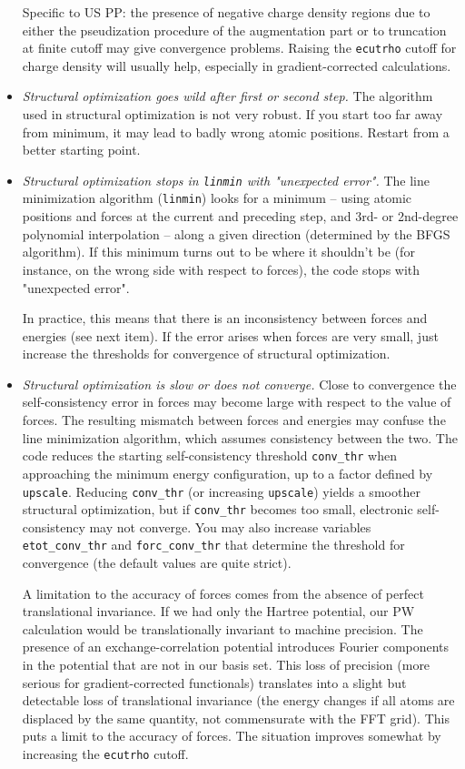 \documentclass[12pt]{article}
\begin{document}
\begin{itemize}
      Specific to US PP: the presence of negative charge density regions 
      due to either the pseudization procedure of the augmentation part 
      or to truncation at finite cutoff may give convergence problems.
      Raising the {\tt ecutrho} cutoff for charge density will usually
      help, especially in gradient-corrected calculations.
\item {\em Structural optimization goes wild after first or second step.}
      The algorithm used in structural optimization is not very robust.
      If you start too far away from minimum, it may lead to badly
      wrong atomic positions. Restart from a better starting point.
\item {\em Structural optimization stops in {\tt linmin} with
       "unexpected error".}
      The line minimization algorithm ({\tt linmin}) looks for a minimum 
      -- using atomic positions and forces at  the current and preceding 
      step, and 3rd- or 2nd-degree polynomial interpolation -- along a 
      given direction (determined by the BFGS algorithm). If this minimum
      turns out to be where it shouldn't be (for instance, on the wrong
      side with respect to forces), the code stops with "unexpected error".

      In practice, this means that there is an inconsistency between 
      forces and energies (see next item). If the error arises when
      forces are very small, just increase the thresholds for convergence
      of structural optimization.
\item {\em Structural optimization is slow or does not converge.}
      Close to convergence the self-consistency error in forces may 
      become large with respect to the value of forces. The resulting 
      mismatch between 
      forces and energies may confuse the line minimization algorithm,
      which assumes consistency between the two. The code reduces
      the starting self-consistency threshold {\tt conv\_thr} when approaching 
      the minimum energy configuration, up to a factor defined by
      {\tt upscale}. Reducing {\tt conv\_thr} (or increasing {\tt upscale}) 
      yields a smoother structural optimization, but if {\tt conv\_thr}
      becomes 
      too small, electronic self-consistency may not converge. You may also 
      increase variables {\tt etot\_conv\_thr} and {\tt forc\_conv\_thr}
      that determine the
      threshold for convergence (the default values are quite strict).

      A limitation to the accuracy of forces comes from the absence of
      perfect translational invariance. If we had only the Hartree
      potential, our PW calculation would be translationally invariant
      to machine precision. The presence of an exchange-correlation
      potential introduces Fourier components in the potential that are
      not in our basis set. This loss of precision (more serious for
      gradient-corrected functionals) translates into a slight but
      detectable loss of translational invariance (the energy changes 
      if all atoms are displaced by the same quantity, not commensurate
      with the FFT grid). This puts a limit to the accuracy of forces.
      The situation improves somewhat by increasing the {\tt ecutrho}
      cutoff.


\end{itemize}
\end{document}
